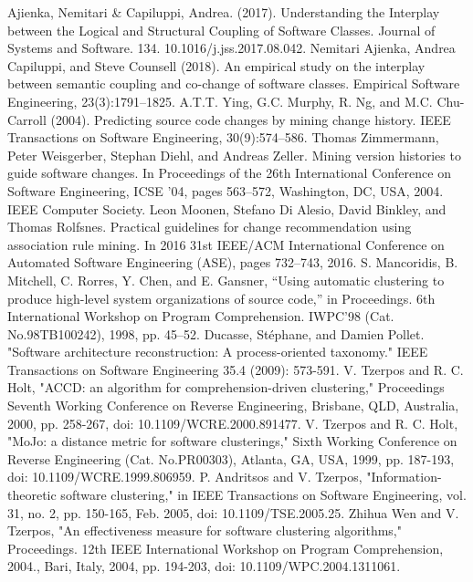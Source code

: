 \documentclass{ieeeaccess}
\begin{document}
\begin{thebibliography}{00}

 Ajienka, Nemitari \& Capiluppi, Andrea. (2017). Understanding the Interplay between the Logical and Structural Coupling of Software Classes. Journal of Systems and Software. 134. 10.1016/j.jss.2017.08.042.
 Nemitari Ajienka, Andrea Capiluppi, and Steve Counsell (2018). An empirical study on the interplay between semantic coupling and co-change of software classes. Empirical Software Engineering, 23(3):1791–1825.
 A.T.T. Ying, G.C. Murphy, R. Ng, and M.C. Chu-Carroll (2004). Predicting source code changes by mining change history. IEEE Transactions on Software Engineering, 30(9):574–586.
 Thomas Zimmermann, Peter Weisgerber, Stephan Diehl, and Andreas Zeller. Mining version histories to guide software changes. In Proceedings of the 26th International Conference on Software Engineering, ICSE ’04, pages 563–572, Washington, DC, USA, 2004. IEEE Computer Society.
 Leon Moonen, Stefano Di Alesio, David Binkley, and Thomas Rolfsnes. Practical guidelines for change recommendation using association rule mining. In 2016 31st IEEE/ACM International Conference on Automated Software Engineering (ASE), pages 732–743, 2016.
 S. Mancoridis, B. Mitchell, C. Rorres, Y. Chen, and E. Gansner, “Using automatic clustering to produce high-level system organizations of source code,” in Proceedings. 6th International Workshop on Program Comprehension. IWPC’98 (Cat. No.98TB100242), 1998, pp. 45–52.
 Ducasse, Stéphane, and Damien Pollet. "Software architecture reconstruction: A process-oriented taxonomy." IEEE Transactions on Software Engineering 35.4 (2009): 573-591.
 V. Tzerpos and R. C. Holt, "ACCD: an algorithm for comprehension-driven clustering," Proceedings Seventh Working Conference on Reverse Engineering, Brisbane, QLD, Australia, 2000, pp. 258-267, doi: 10.1109/WCRE.2000.891477.
 V. Tzerpos and R. C. Holt, "MoJo: a distance metric for software clusterings," Sixth Working Conference on Reverse Engineering (Cat. No.PR00303), Atlanta, GA, USA, 1999, pp. 187-193, doi: 10.1109/WCRE.1999.806959.
 P. Andritsos and V. Tzerpos, "Information-theoretic software clustering," in IEEE Transactions on Software Engineering, vol. 31, no. 2, pp. 150-165, Feb. 2005, doi: 10.1109/TSE.2005.25. 
 Zhihua Wen and V. Tzerpos, "An effectiveness measure for software clustering algorithms," Proceedings. 12th IEEE International Workshop on Program Comprehension, 2004., Bari, Italy, 2004, pp. 194-203, doi: 10.1109/WPC.2004.1311061.

\end{thebibliography}
\end{document}

